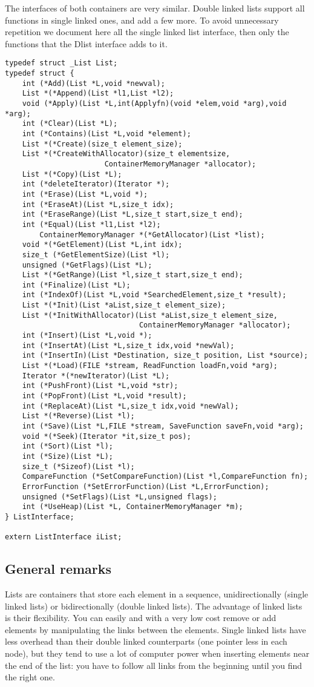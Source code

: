 \documentclass[12pt,a4paper]{memoir} %
\begin{document}
The interfaces of both containers are very similar. Double linked lists support all functions in single linked ones, and add a few more. To avoid unnecessary repetition we document here all the single linked list interface, then only the functions that the Dlist interface adds to it.
\begin{verbatim}
typedef struct _List List;
typedef struct {
    int (*Add)(List *L,void *newval);
    List *(*Append)(List *l1,List *l2);
    void (*Apply)(List *L,int(Applyfn)(void *elem,void *arg),void *arg);
    int (*Clear)(List *L); 
    int (*Contains)(List *L,void *element);
    List *(*Create)(size_t element_size);
    List *(*CreateWithAllocator)(size_t elementsize,
                       ContainerMemoryManager *allocator);
    List *(*Copy)(List *L);
    int (*deleteIterator)(Iterator *);
    int (*Erase)(List *L,void *);
    int (*EraseAt)(List *L,size_t idx);
    int (*EraseRange)(List *L,size_t start,size_t end);    
    int (*Equal)(List *l1,List *l2);
    	ContainerMemoryManager *(*GetAllocator)(List *list);
    void *(*GetElement)(List *L,int idx);
    size_t (*GetElementSize)(List *l);
    unsigned (*GetFlags)(List *L);
    List *(*GetRange)(List *l,size_t start,size_t end);
    int (*Finalize)(List *L);
    int (*IndexOf)(List *L,void *SearchedElement,size_t *result);
    List *(*Init)(List *aList,size_t element_size);
    List *(*InitWithAllocator)(List *aList,size_t element_size,
                               ContainerMemoryManager *allocator);
    int (*Insert)(List *L,void *);
    int (*InsertAt)(List *L,size_t idx,void *newVal);
    int (*InsertIn)(List *Destination, size_t position, List *source);
    List *(*Load)(FILE *stream, ReadFunction loadFn,void *arg);
    Iterator *(*newIterator)(List *L);
    int (*PushFront)(List *L,void *str);
    int (*PopFront)(List *L,void *result);
    int (*ReplaceAt)(List *L,size_t idx,void *newVal);
    List *(*Reverse)(List *l);
    int (*Save)(List *L,FILE *stream, SaveFunction saveFn,void *arg);
    void *(*Seek)(Iterator *it,size_t pos);
    int (*Sort)(List *l);
    int (*Size)(List *L); 
    size_t (*Sizeof)(List *l);
    CompareFunction (*SetCompareFunction)(List *l,CompareFunction fn);
    ErrorFunction (*SetErrorFunction)(List *L,ErrorFunction); 
    unsigned (*SetFlags)(List *L,unsigned flags);
    int (*UseHeap)(List *L, ContainerMemoryManager *m);
} ListInterface;

extern ListInterface iList;
\end{verbatim}
\subsection{General remarks}
Lists are containers that store each element in a sequence, unidirectionally (single linked lists) or bidirectionally (double linked lists).
The advantage of linked lists is their flexibility. You can easily and with a very low cost remove or add elements by manipulating the links between the elements. Single linked lists have less overhead than their double linked counterparts (one pointer less in each node), but they tend to use a lot of computer power when inserting elements near the end of the list: you have to follow all links from the beginning until you find the right one.
\end{document}
